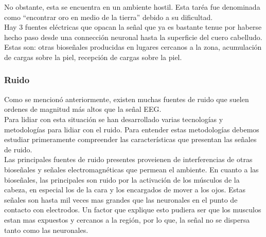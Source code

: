 No obstante, esta se encuentra en un ambiente hostil. Esta taréa fue denominada como “encontrar oro en medio de la tierra” debido a su dificultad.\\

Hay 3 fuentes eléctricas que opacan la señal que ya es bastante tenue por haberse hecho paso desde una connección neuronal hasta la superficie del cuero cabelludo. Estas son: otras bioseñales producidas en lugares cercanos a la zona, acumulación de cargas sobre la piel, recepción de cargas sobre la piel.\\

\subsubsection{Ruido}
\label{sec:org8ec815b}
Como se mencionó anteriormente, existen muchas fuentes de ruido que suelen ordenes de magnitud más altos que la señal EEG.\\

Para lidiar con esta situación se han desarrollado varias tecnologías y metodologías para lidiar con el ruido. Para entender estas metodologías debemos estudiar primeramente compreender las características que presentan las señales de ruido.\\

Las principales fuentes de ruido presentes proveienen de interferencias de otras bioseñales y señales electromagnéticas que permean el ambiente. En cuanto a las bioseñales, las principales son ruido por la activación de los músculos de la cabeza, en especial los de la cara y los encargados de mover a los ojos. Estas señales son hasta mil veces mas grandes que las neuronales en el punto de contacto con electrodos. Un factor que explique esto pudiera ser que los musculos estan mas expuestos y cercanos a la región, por lo que, la señal no se dispersa tanto como las neuronales.\\

